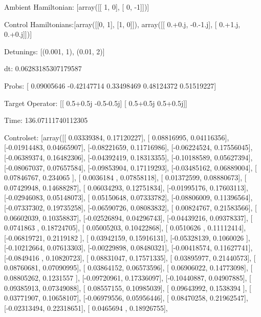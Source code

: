 \documentclass{article}
\begin{document}
    

\newpage

Ambient Hamiltonian: [array([[ 1,  0],
       [ 0, -1]])]

Control Hamiltonians:[array([[0, 1],
       [1, 0]]), array([[ 0.+0.j, -0.-1.j],
       [ 0.+1.j,  0.+0.j]])]

Detunings: [(0.001, 1), (0.01, 2)]

 dt: 0.06283185307179587

Probs: [ 0.09005646 -0.42147714  0.33498469  0.48124372  0.51519227]

Target Operator: [[ 0.5+0.5j -0.5-0.5j]
 [ 0.5+0.5j  0.5+0.5j]]

Time: 136.07111740112305

Controlset: [array([[ 0.03339384,  0.17120227],
       [ 0.08816995,  0.04116356],
       [-0.01914483,  0.04665907],
       [-0.08221659,  0.11716986],
       [-0.06224524,  0.17556045],
       [-0.06389374,  0.16482306],
       [-0.04392419,  0.18313355],
       [-0.10188589,  0.05627394],
       [-0.08067037,  0.07657584],
       [-0.09853904,  0.17119293],
       [-0.03485162,  0.06889004],
       [ 0.07846767,  0.234065  ],
       [ 0.0036184 ,  0.07858118],
       [ 0.01372599,  0.08880673],
       [ 0.07429948,  0.14688287],
       [ 0.06034293,  0.12751834],
       [-0.01995176,  0.17603113],
       [-0.02946083,  0.05148073],
       [ 0.05150648,  0.07333782],
       [-0.08806009,  0.11396564],
       [-0.07337302,  0.19735258],
       [-0.06590726,  0.08083832],
       [ 0.00824767,  0.21583566],
       [ 0.06602039,  0.10358837],
       [-0.02526894,  0.04296743],
       [-0.04439216,  0.09378337],
       [ 0.0741863 ,  0.18724705],
       [ 0.05005203,  0.10422868],
       [ 0.0510626 ,  0.11112414],
       [-0.06819721,  0.2119182 ],
       [ 0.03942159,  0.15916131],
       [-0.05328139,  0.1060026 ],
       [-0.10212664,  0.07613303],
       [-0.00229898,  0.08480321],
       [-0.00418574,  0.11627741],
       [-0.0849416 ,  0.10820723],
       [ 0.08831047,  0.17571335],
       [ 0.03895977,  0.21440573],
       [ 0.08760681,  0.07090995],
       [ 0.03864152,  0.06573596],
       [ 0.06906022,  0.14773098],
       [ 0.08805262,  0.1231557 ],
       [-0.09720961,  0.17336097],
       [-0.10440887,  0.04907885],
       [ 0.09385913,  0.07349088],
       [ 0.08557155,  0.10985039],
       [ 0.09643992,  0.1538394 ],
       [ 0.03771907,  0.10658107],
       [-0.06979556,  0.05956446],
       [ 0.08470258,  0.21962547],
       [-0.02313494,  0.22318651],
       [ 0.0465694 ,  0.18926755],
\end{document}
